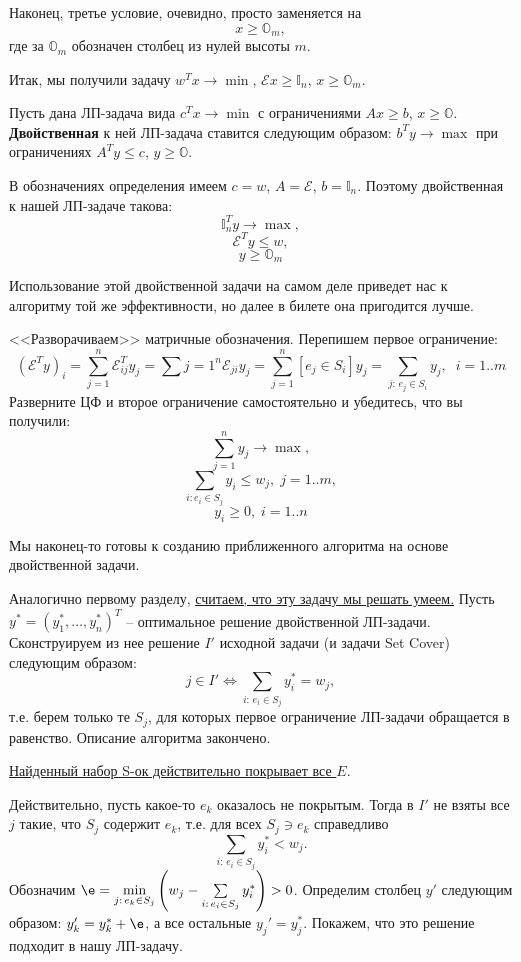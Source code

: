 Наконец, третье условие, очевидно, просто заменяется на $$x \geq \mathbb{O}_m,$$ где за $\mathbb{O}_m$ обозначен столбец из нулей высоты $m$.

Итак, мы получили задачу $w^Tx \rightarrow \min$, $\mathcal{E} x \geq \mathbb{I}_n$, $x \geq \mathbb{O}_m$.

\begin{definition*}
	Пусть дана ЛП-задача вида $c^Tx\rightarrow\min$ с ограничениями $Ax \geq b$, $x \geq \mathbb{O}$. \textbf{Двойственная} к ней ЛП-задача ставится следующим образом: $b^Ty \rightarrow\max$ при ограничениях $A^Ty \leq c$, $y \geq \mathbb{O}$.
\end{definition*}

В обозначениях определения имеем $c = w$, $A = \mathcal E$, $b = \mathbb{I}_n$. Поэтому двойственная к нашей ЛП-задаче такова:
$$\mathbb{I}_n^Ty \rightarrow \max,$$
$$\mathcal{E}^T y \leq w,$$
$$y \geq \mathbb{O}_m$$

Использование этой двойственной задачи на самом деле приведет нас к алгоритму той же эффективности, но далее в билете она пригодится лучше.

<<Разворачиваем>> матричные обозначения. Перепишем первое ограничение:
$$(\mathcal{E}^Ty)_i = \sum_{j=1}^n\mathcal{E}^T_{ij}y_j = \sum{j=1}^n\mathcal{E}_{ji}y_j = \sum_{j=1}^n [e_j \in S_i] y_j = \sum_{j:\, e_j \in S_i} y_j, \;\; i=1..m$$
Разверните ЦФ и второе ограничение самостоятельно и убедитесь, что вы получили:
$$\sum_{j=1}^n y_j \rightarrow\max,$$
$$\sum_{i: e_i \in S_j} y_i\leq w_j, \; j=1..m,$$
$$y_i \geq 0, \; i=1..n$$

Мы наконец-то готовы к созданию приближенного алгоритма на основе двойственной задачи.


Аналогично первому разделу, \underline{считаем, что эту задачу мы решать умеем.} Пусть $y^* = (y_1^*, \ldots, y_n^*)^T$ -- оптимальное решение двойственной ЛП-задачи. Сконструируем из нее решение $I'$ исходной задачи (и задачи Set Cover) следующим образом:
$$j \in I' \iff \sum_{i:\, e_i \in S_j}y_i^* = w_j,$$
т.е. берем только те $S_j$, для которых первое ограничение ЛП-задачи обращается в равенство.
Описание алгоритма закончено.

\underline{Найденный набор S-ок действительно покрывает все $E$}.

Действительно, пусть какое-то $e_k$ оказалось не покрытым. Тогда в $I'$ не взяты все $j$ такие, что $S_j$ содержит $e_k$, т.е. для всех $S_j \ni e_k$ справедливо $$\sum_{i:\, e_i \in S_j}y_i^* < w_j.$$
Обозначим $\e = \min\limits_{j:\, e_k \in S_j} \left(w_j - \sum\limits_{i:\, e_i \in S_j}y_i^*\right) > 0$. Определим столбец $y'$ следующим образом: $y_k' = y_k^* + \e$, а все остальные $y_j' = y_j^*$. Покажем, что это решение подходит в нашу ЛП-задачу.

